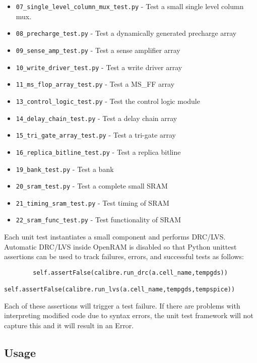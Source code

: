 \begin{itemize}
\item \verb|07_single_level_column_mux_test.py| - Test a small single level column mux.
\item \verb|08_precharge_test.py| - Test a dynamically generated precharge array
\item \verb|09_sense_amp_test.py| - Test a sense amplifier array
\item \verb|10_write_driver_test.py| - Test a write driver array
\item \verb|11_ms_flop_array_test.py| - Test a MS\_FF array 
\item \verb|13_control_logic_test.py| - Test the control logic module
\item \verb|14_delay_chain_test.py| - Test a delay chain array
\item \verb|15_tri_gate_array_test.py| - Test a tri-gate array
\item \verb|16_replica_bitline_test.py| - Test a replica bitline
\item \verb|19_bank_test.py| - Test a bank
\item \verb|20_sram_test.py| - Test a complete small SRAM
\item \verb|21_timing_sram_test.py| - Test timing of  SRAM
\item \verb|22_sram_func_test.py| - Test functionality of SRAM
\end {itemize}

Each unit test instantiates a small component and performs DRC/LVS. Automatic DRC/LVS inside OpenRAM is disabled so that Python unittest assertions can be used to track failures, errors, and successful tests as follows:
\begin{verbatim}
        self.assertFalse(calibre.run_drc(a.cell_name,tempgds))
        self.assertFalse(calibre.run_lvs(a.cell_name,tempgds,tempspice))
\end{verbatim}
Each of these assertions will trigger a test failure. If there are
problems with interpreting modified code due to syntax errors, the
unit test framework will not capture this and it will result in an
Error. 

\subsection{Usage}

